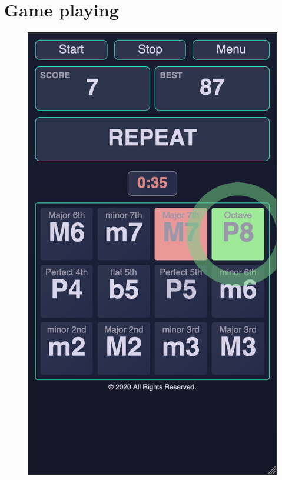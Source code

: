 \section{Game playing}
\begin{figure}[H]
\centering
\includegraphics[scale=.33]{Parts/Fig/gameplaying.png}
\vspace*{-5mm}
\end{figure}


